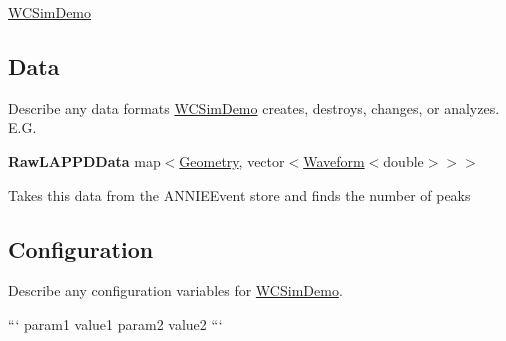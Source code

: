 \hyperlink{classWCSimDemo}{W\-C\-Sim\-Demo}

\subsection*{Data}

Describe any data formats \hyperlink{classWCSimDemo}{W\-C\-Sim\-Demo} creates, destroys, changes, or analyzes. E.\-G.

{\bfseries Raw\-L\-A\-P\-P\-D\-Data} {\ttfamily map$<$\hyperlink{classGeometry}{Geometry}, vector$<$\hyperlink{classWaveform}{Waveform}$<$double$>$$>$$>$}
\begin{DoxyItemize}
\item Takes this data from the {\ttfamily A\-N\-N\-I\-E\-Event} store and finds the number of peaks
\end{DoxyItemize}

\subsection*{Configuration}

Describe any configuration variables for \hyperlink{classWCSimDemo}{W\-C\-Sim\-Demo}.

``` param1 value1 param2 value2 ``` 